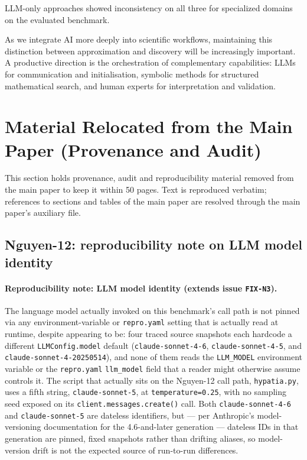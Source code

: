 \documentclass[twoside,11pt]{article}
\begin{document}
LLM-only approaches showed inconsistency on all three for specialized domains on the evaluated benchmark.

As we integrate AI more deeply into scientific workflows, maintaining this distinction between approximation and discovery will be increasingly important. A productive direction is the orchestration of complementary capabilities: LLMs for communication and initialisation, symbolic methods for structured mathematical search, and human experts for interpretation and validation.






\providecommand{\Rsq}{R^{2}}
\section{Material Relocated from the Main Paper (Provenance and Audit)}\label{sec:relocated_audit}
This section holds provenance, audit and reproducibility material removed from the main paper to keep it within 50 pages. Text is reproduced verbatim; references to sections and tables of the main paper are resolved through the main paper's auxiliary file.

\subsection{Nguyen-12: reproducibility note on LLM model identity}
\paragraph{Reproducibility note: LLM model identity (extends issue
\texttt{FIX-N3}).} The language model actually
invoked on this benchmark's call path is not pinned via any
environment-variable or \texttt{repro.yaml} setting that is actually read
at runtime, despite appearing to be: four traced source snapshots each
hardcode a different \texttt{LLMConfig.model} default
(\texttt{claude-sonnet-4-6}, \texttt{claude-sonnet-4-5}, and
\texttt{claude-sonnet-4-20250514}), and none of them reads the
\texttt{LLM\_MODEL} environment variable or the \texttt{repro.yaml}
\texttt{llm\_model} field that a reader might otherwise assume controls
it. The script that actually sits on the Nguyen-12 call path,
\texttt{hypatia.py}, uses a fifth string, \texttt{claude-sonnet-5}, at
\texttt{temperature=0.25}, with no sampling seed exposed on its
\texttt{client.messages.create()} call. Both \texttt{claude-sonnet-4-6}
and \texttt{claude-sonnet-5} are dateless identifiers, but --- per
Anthropic's model-versioning documentation for the 4.6-and-later
generation --- dateless IDs in that generation are pinned, fixed
snapshots rather than drifting aliases, so model-version drift is not the
expected source of run-to-run differences.
\end{document}
